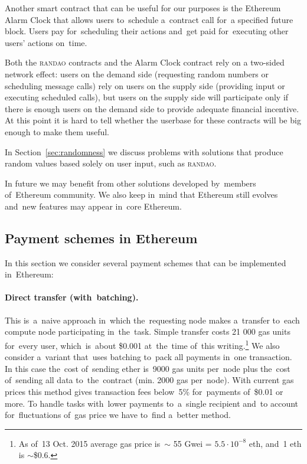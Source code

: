 \documentclass[a4paper]{article}
\begin{document}
    Another smart contract that can be useful for our purposes is the Ethereum Alarm Clock \cite{ALARM}
    that allows users to~schedule a~contract call for~a specified future block.
    Users pay for~scheduling their actions and~get paid for~executing other users' actions on~time.

    Both the \textsc{randao} contracts and the Alarm Clock contract rely on a two-sided network effect:
    users on the demand side (requesting random numbers or scheduling message calls) rely on users on the supply side
    (providing input or executing scheduled calls), but users on the supply side will participate only if there is
    enough users on the demand side to provide adequate financial incentive. At this point it is hard to tell whether 
    the userbase for these contracts will be big enough to make them useful.

    In Section~\ref{sec:randomness} we discuss problems with solutions that produce random values based solely on user input,
    such as \textsc{randao}.
    
    In future we may benefit from other solutions developed by~members of~Ethereum community. We also keep in~mind that
    Ethereum still evolves and~new features may appear in~core Ethereum.

    \subsection{Payment schemes in Ethereum}
    \label{sec:ethereum-schemes}

    In this section we consider several payment schemes that can be implemented in~Ethereum:

    \paragraph{Direct transfer (with~batching).}
    This is~a~naive approach in~which the~requesting node makes a~transfer to~each compute node participating in~the~task.
    Simple transfer costs 21 000 gas units for~every user, which~is~about \$0.001 at~the~time of~this writing.\footnote{%
      As of~13 Oct. 2015 average gas price is~$\sim$ 55 Gwei = $5.5 \cdot 10^{-8}$ eth, and~1 eth is $\sim$\$0.6.}
    We also consider a~variant that~uses batching\cite{BUTERIN} to~pack all payments in~one transaction.
    In this case the~cost of~sending ether is~9000 gas units per~node plus the~cost of~sending all data
    to~the~contract (min. 2000 gas per~node). With current gas prices this method gives transaction fees
    below~5\% for~payments of~\$0.01 or more. To handle tasks with~lower payments to~a~single recipient and~to
    account for~fluctuations of~gas price we have to~find a~better method.
\end{document}
